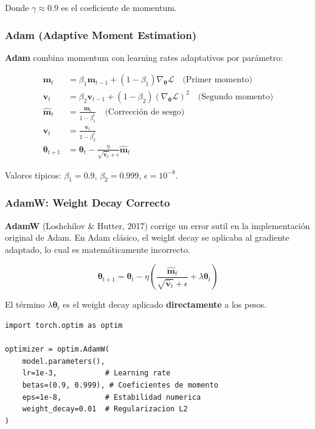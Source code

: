 \documentclass[12pt,a4paper]{article}
\begin{document}
Donde $\gamma \approx 0.9$ es el coeficiente de momentum.

\subsubsection{Adam (Adaptive Moment Estimation)}

\textbf{Adam} combina momentum con learning rates adaptativos por parámetro:

\begin{align}
\mathbf{m}_t &= \beta_1 \mathbf{m}_{t-1} + (1-\beta_1) \nabla_{\boldsymbol{\theta}} \mathcal{L} \quad \text{(Primer momento)} \\
\mathbf{v}_t &= \beta_2 \mathbf{v}_{t-1} + (1-\beta_2) (\nabla_{\boldsymbol{\theta}} \mathcal{L})^2 \quad \text{(Segundo momento)} \\
\hat{\mathbf{m}}_t &= \frac{\mathbf{m}_t}{1-\beta_1^t} \quad \text{(Corrección de sesgo)} \\
\hat{\mathbf{v}}_t &= \frac{\mathbf{v}_t}{1-\beta_2^t} \\
\boldsymbol{\theta}_{t+1} &= \boldsymbol{\theta}_t - \frac{\eta}{\sqrt{\hat{\mathbf{v}}_t} + \epsilon} \hat{\mathbf{m}}_t
\end{align}

Valores típicos: $\beta_1 = 0.9$, $\beta_2 = 0.999$, $\epsilon = 10^{-8}$.

\subsubsection{AdamW: Weight Decay Correcto}

\textbf{AdamW} (Loshchilov \& Hutter, 2017) corrige un error sutil en la implementación original de Adam. En Adam clásico, el weight decay se aplicaba al gradiente adaptado, lo cual es matemáticamente incorrecto.

\begin{equation}
\boldsymbol{\theta}_{t+1} = \boldsymbol{\theta}_t - \eta \left( \frac{\hat{\mathbf{m}}_t}{\sqrt{\hat{\mathbf{v}}_t} + \epsilon} + \lambda \boldsymbol{\theta}_t \right)
\end{equation}

El término $\lambda \boldsymbol{\theta}_t$ es el weight decay aplicado \textbf{directamente} a los pesos.

\begin{lstlisting}[caption={Configuración de AdamW en PyTorch}]
import torch.optim as optim

optimizer = optim.AdamW(
    model.parameters(),
    lr=1e-3,           # Learning rate
    betas=(0.9, 0.999), # Coeficientes de momento
    eps=1e-8,          # Estabilidad numerica
    weight_decay=0.01  # Regularizacion L2
)
\end{lstlisting}
\end{document}
